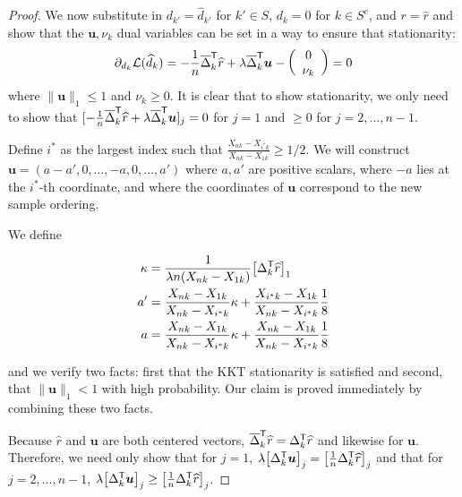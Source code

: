 \documentclass[12pt,pdftex,aos,noinfoline,addressasfootnote]{imsart}
\begin{document}
\begin{proof}
We now substitute in $d_{k'} = \hat{d}_{k'}$ for $k' \in S$, $d_k = 0$ for $k \in S^c$, and $r = \hat{r}$ and show that the $\mathbf{u}, \nu_k$ dual variables can be set in a way to ensure that stationarity:
\begin{align*}
\partial_{d_k} \mathcal{L}(\widehat{d}_k) = -\frac{1}{n} \overline{\Delta}_k^{\mathsf{T}}\widehat{r} + \lambda \overline{\Delta}_k^{\mathsf{T}} \mbox{\boldmath $u$}
           - \left( \begin{array}{c} 0 \\ \nu_k \end{array} \right) = 0 
\end{align*}
where $\| \mathbf{u} \|_1 \leq 1$ and $\nu_k \geq 0$. It is clear that to show stationarity, we only need to show that $[-\frac{1}{n} \overline{\Delta}_k^{\mathsf{T}} \widehat{r} + \lambda \overline{\Delta}_k^{\mathsf{T}} \mbox{\boldmath $u$}]_j = 0$ for $j=1$ and $\geq 0$ for $j=2,...,n-1$.


Define $i^*$ as the largest index such that $\frac{X_{nk} - X_{i^*k}}{X_{nk} - X_{1k}} \geq 1/2$. 
We will construct $\mathbf{u} = (a - a', 0, ..., -a, 0,..., a')$ where
$a,a'$ are positive scalars, where $-a$ lies at the $i^*$-th coordinate, and where the coordinates of $\mathbf{u}$ correspond
to the new sample ordering. 

We define

\begin{align*}
\kappa &= \frac{1}{\lambda n (X_{nk} - X_{1k})} \big[ \Delta_k^{\mathsf{T}} \widehat{r} \big]_1 \\
a' &= \frac{X_{nk} - X_{1k}}{X_{nk} -  X_{i^*k}} \kappa + 
     \frac{X_{i^*k}-X_{1k}}{X_{nk} - X_{i^*k}} \frac{1}{8} \\
a &= \frac{X_{nk} - X_{1k}}{X_{nk} -  X_{i^*k}} \kappa + 
     \frac{X_{nk}-X_{1k}}{X_{nk} - X_{i^*k}} \frac{1}{8} \\
\end{align*}

and we verify two facts: first that the KKT stationarity is satisfied and second, that $\| \mathbf{u} \|_1 < 1$ with high probability. Our claim is proved immediately by combining these two facts.

Because $\hat{r}$ and $\mathbf{u}$ are both centered vectors, $\overline{\Delta}_k^{\mathsf{T}} \widehat{r} = \Delta_k^{\mathsf{T}} \widehat{r}$ and likewise for $\mathbf{u}$. Therefore, we need only show that for $j=1$, $\lambda \big[ \Delta_k^{\mathsf{T}} \mbox{\boldmath $u$} \big]_j = \big[ \frac{1}{n} \Delta_k^{\mathsf{T}} \widehat{r} \big]_j$ and that for $j = 2,..., n-1$, $\lambda \big[ \Delta_k^{\mathsf{T}} \mbox{\boldmath $u$} \big]_j \geq \big[ \frac{1}{n} \Delta_k^{\mathsf{T}} \widehat{r} \big]_j$.


\end{proof}
\end{document}
